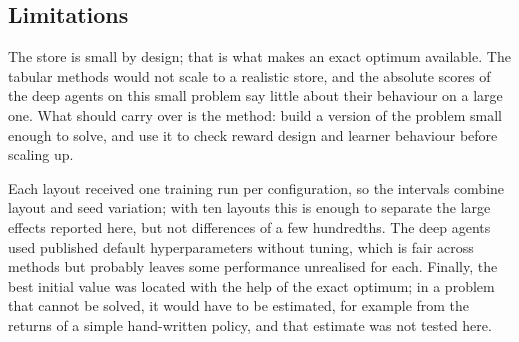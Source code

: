 \subsection{Limitations}
The store is small by design; that is what makes an exact optimum available. The tabular methods would not scale to a realistic store, and the absolute scores of the deep agents on this small problem say little about their behaviour on a large one. What should carry over is the method: build a version of the problem small enough to solve, and use it to check reward design and learner behaviour before scaling up.

Each layout received one training run per configuration, so the intervals combine layout and seed variation; with ten layouts this is enough to separate the large effects reported here, but not differences of a few hundredths. The deep agents used published default hyperparameters without tuning, which is fair across methods but probably leaves some performance unrealised for each. Finally, the best initial value was located with the help of the exact optimum; in a problem that cannot be solved, it would have to be estimated, for example from the returns of a simple hand-written policy, and that estimate was not tested here.
